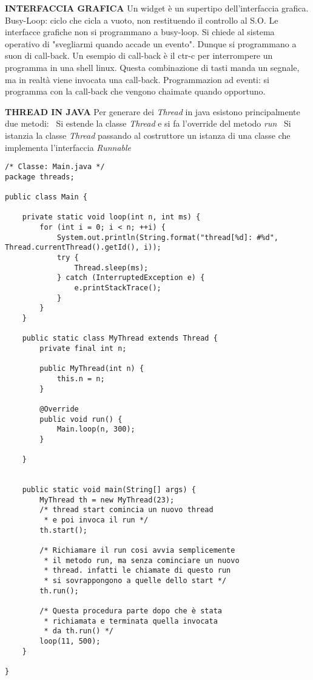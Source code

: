 \noindent \textbf{INTERFACCIA GRAFICA} \newline
Un widget è un supertipo dell'interfaccia grafica. \newline
Busy-Loop: ciclo che cicla a vuoto, non restituendo il controllo al S.O. \newline
Le interfacce grafiche non si programmano a busy-loop. Si chiede al sistema operativo di "svegliarmi quando accade un evento". Dunque si programmano a suon di call-back. \newline
Un esempio di call-back è il ctr-c per interrompere un programma in una shell linux. Questa combinazione di tasti manda un segnale, ma in realtà viene invocata una call-back. \newline
Programmazion ad eventi: si programma con la call-back che vengono chaimate quando opportuno.

\noindent \textbf{THREAD IN JAVA} \newline
Per generare dei \textit{Thread} in java esistono principalmente due metodi: \newline
\textbullet\ Si estende la classe \textit{Thread} e si fa l'override del metodo \textit{run} \newline
\textbullet\ Si istanzia la classe \textit{Thread} passando al costruttore un istanza di una classe che implementa l'interfaccia \textit{Runnable}



\begin{lstlisting}[basicstyle=\small,]
/* Classe: Main.java */
package threads;

public class Main {

    private static void loop(int n, int ms) {
        for (int i = 0; i < n; ++i) {
            System.out.println(String.format("thread[%d]: #%d", Thread.currentThread().getId(), i));
            try {
                Thread.sleep(ms);
            } catch (InterruptedException e) {
                e.printStackTrace();
            }
        }
    }

    public static class MyThread extends Thread {
        private final int n;

        public MyThread(int n) {
            this.n = n;
        }

        @Override
        public void run() {
            Main.loop(n, 300);
        }

    }


    public static void main(String[] args) {
        MyThread th = new MyThread(23);
        /* thread start comincia un nuovo thread
         * e poi invoca il run */
        th.start();
        
        /* Richiamare il run cosi avvia semplicemente 
         * il metodo run, ma senza cominciare un nuovo 
         * thread. infatti le chiamate di questo run
         * si sovrappongono a quelle dello start */
        th.run();
        
        /* Questa procedura parte dopo che è stata 
         * richiamata e terminata quella invocata
         * da th.run() */
        loop(11, 500);
    }

}
\end{lstlisting}

